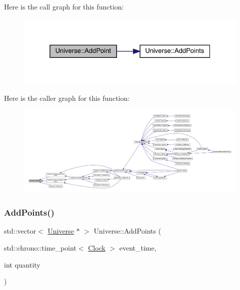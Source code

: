 Here is the call graph for this function\+:
\nopagebreak
\begin{figure}[H]
\begin{center}
\leavevmode
\includegraphics[width=325pt]{class_universe_a8508b791c6997d8abcdcc037a6776734_cgraph}
\end{center}
\end{figure}
Here is the caller graph for this function\+:
\nopagebreak
\begin{figure}[H]
\begin{center}
\leavevmode
\includegraphics[width=350pt]{class_universe_a8508b791c6997d8abcdcc037a6776734_icgraph}
\end{center}
\end{figure}
\mbox{\label{class_universe_aa48ced2078ba863723050d8283b3fa67}} 
\subsubsection{\texorpdfstring{Add\+Points()}{AddPoints()}}
{\footnotesize\ttfamily std\+::vector$<$ \hyperlink{class_universe}{Universe} $\ast$ $>$ Universe\+::\+Add\+Points (\begin{DoxyParamCaption}\item[{std\+::chrono\+::time\+\_\+point$<$ \hyperlink{universe_8h_a0ef8d951d1ca5ab3cfaf7ab4c7a6fd80}{Clock} $>$}]{event\+\_\+time,  }\item[{int}]{quantity }\end{DoxyParamCaption})}



